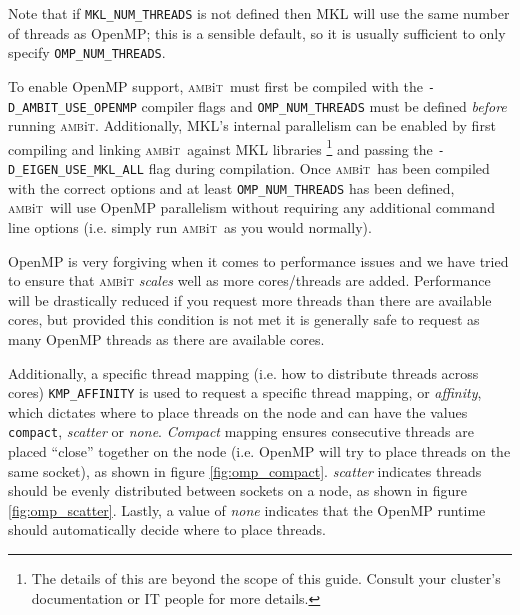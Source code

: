 \documentclass{report}
\newcommand{\ambit}{\textsc{amb}{\footnotesize i}\textsc{t}}
\begin{document}
Note that if \texttt{MKL\_NUM\_THREADS} is not defined then MKL will use the same number of threads as 
OpenMP; this is a sensible default, so it is usually sufficient to only specify 
\texttt{OMP\_NUM\_THREADS}. 

To enable OpenMP support, \ambit ~must first be compiled with the \texttt{-D\_AMBIT\_USE\_OPENMP} compiler
flags and \texttt{OMP\_NUM\_THREADS} must be defined \emph{before} running \ambit. Additionally, MKL's
internal parallelism can be enabled by first compiling and linking \ambit ~against MKL libraries
\footnote{The details of this are beyond the scope of this guide. Consult your cluster's documentation or
IT people for more details.} and passing the \texttt{-D\_EIGEN\_USE\_MKL\_ALL} flag during compilation.
Once \ambit ~has been compiled with the correct options and at least \texttt{OMP\_NUM\_THREADS} has been
defined, \ambit ~will use OpenMP parallelism without requiring any additional command line options (i.e.
simply run \ambit ~as you would normally).

OpenMP is very forgiving when it comes to performance issues and we have tried to ensure that \ambit
\textit{scales} well as more cores/threads are added. Performance will be drastically reduced if you
request more threads than there are available cores, but provided this condition is not met it is
generally safe to request as many OpenMP threads as there are available cores.

Additionally, a specific thread mapping (i.e. how to distribute threads across cores)
\texttt{KMP\_AFFINITY} is used to request a specific thread mapping, or
\textit{affinity}, which dictates where to place threads on the node and can have the values 
\texttt{compact}, \textit{scatter} or \textit{none}. \textit{Compact} mapping ensures consecutive 
threads are placed ``close'' together on the node (i.e. OpenMP will try to place threads on the same 
socket), as shown in figure \ref{fig:omp_compact}. 
\textit{scatter} indicates threads should be evenly distributed between sockets on a node, as shown in
figure \ref{fig:omp_scatter}.
Lastly, a value of \textit{none} indicates that the OpenMP runtime should automatically decide where to 
place threads.
\end{document}
